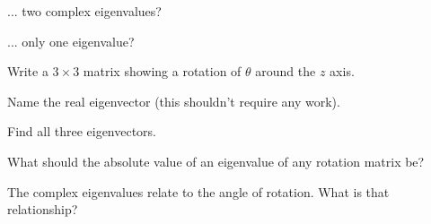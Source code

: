 \documentclass[../gatm_answers.tex]{subfiles}
\begin{document}
\begin{inner_problem}
\item ... two complex eigenvalues?
\end{inner_problem}

\begin{inner_problem}
\item ... only one eigenvalue?
\end{inner_problem}

\begin{outer_problem}
\item
\end{outer_problem}

\begin{inner_problem}[start=1]
\item Write a $3\times 3$ matrix showing a rotation of $\theta$ around the $z$ axis.
\end{inner_problem}

\begin{inner_problem}
\item Name the real eigenvector (this shouldn't require any work).
\end{inner_problem}

\begin{inner_problem}
\item Find all three eigenvectors.
\end{inner_problem}

\begin{outer_problem}
\item
\end{outer_problem}

\begin{inner_problem}
\item What should the absolute value of an eigenvalue of any rotation matrix be?
\end{inner_problem}

\begin{inner_problem}
\item The complex eigenvalues relate to the angle of rotation. What is that relationship?
\end{inner_problem}
\end{document}

